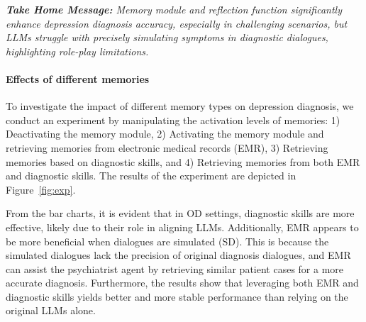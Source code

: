 
\textit{\textbf{Take Home Message: } Memory module and reflection function significantly enhance depression diagnosis accuracy, especially in challenging scenarios, but LLMs struggle with precisely simulating symptoms in diagnostic dialogues, highlighting role-play limitations.}


\paragraph{Effects of different memories}

To investigate the impact of different memory types on depression diagnosis, we conduct an experiment by manipulating the activation levels of memories: 1) Deactivating the memory module, 2) Activating the memory module and retrieving memories from electronic medical records (EMR), 3) Retrieving memories based on diagnostic skills, and 4) Retrieving memories from both EMR and diagnostic skills. The results of the experiment are depicted in Figure~\ref{fig:exp}. 

From the bar charts, it is evident that in OD settings, diagnostic skills are more effective, likely due to their role in aligning LLMs. Additionally, EMR appears to be more beneficial when dialogues are simulated (SD). This is because the simulated dialogues lack the precision of original diagnosis dialogues, and EMR can assist the psychiatrist agent by retrieving similar patient cases for a more accurate diagnosis. Furthermore, the results show that leveraging both EMR and diagnostic skills yields better and more stable performance than relying on the original LLMs alone.



